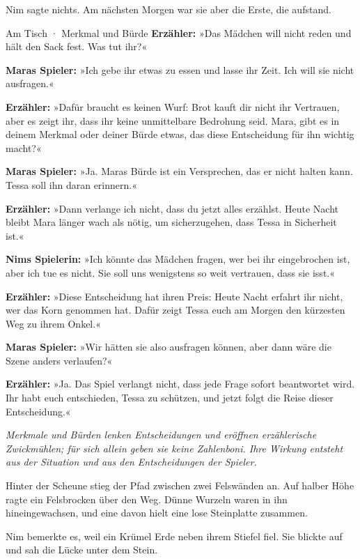\documentclass[10pt,a4paper]{article}
\begin{document}
Nim sagte nichts. Am nächsten Morgen war sie aber die Erste, die aufstand.
\begin{rpgexample}{Am Tisch · Merkmal und Bürde}
\textbf{Erzähler:} »Das Mädchen will nicht reden und hält den Sack fest. Was tut ihr?«

\textbf{Maras Spieler:} »Ich gebe ihr etwas zu essen und lasse ihr Zeit. Ich will sie nicht ausfragen.«

\textbf{Erzähler:} »Dafür braucht es keinen Wurf: Brot kauft dir nicht ihr Vertrauen, aber es zeigt ihr, dass ihr keine unmittelbare Bedrohung seid. Mara, gibt es in deinem Merkmal oder deiner Bürde etwas, das diese Entscheidung für ihn wichtig macht?«

\textbf{Maras Spieler:} »Ja. Maras Bürde ist ein Versprechen, das er nicht halten kann. Tessa soll ihn daran erinnern.«

\textbf{Erzähler:} »Dann verlange ich nicht, dass du jetzt alles erzählst. Heute Nacht bleibt Mara länger wach als nötig, um sicherzugehen, dass Tessa in Sicherheit ist.«

\textbf{Nims Spielerin:} »Ich könnte das Mädchen fragen, wer bei ihr eingebrochen ist, aber ich tue es nicht. Sie soll uns wenigstens so weit vertrauen, dass sie isst.«

\textbf{Erzähler:} »Diese Entscheidung hat ihren Preis: Heute Nacht erfahrt ihr nicht, wer das Korn genommen hat. Dafür zeigt Tessa euch am Morgen den kürzesten Weg zu ihrem Onkel.«

\textbf{Maras Spieler:} »Wir hätten sie also ausfragen können, aber dann wäre die Szene anders verlaufen?«

\textbf{Erzähler:} »Ja. Das Spiel verlangt nicht, dass jede Frage sofort beantwortet wird. Ihr habt euch entschieden, Tessa zu schützen, und jetzt folgt die Reise dieser Entscheidung.«

\emph{Merkmale und Bürden lenken Entscheidungen und eröffnen erzählerische Zwickmühlen; für sich allein geben sie keine Zahlenboni. Ihre Wirkung entsteht aus der Situation und aus den Entscheidungen der Spieler.}

\end{rpgexample}
Hinter der Scheune stieg der Pfad zwischen zwei Felswänden an. Auf halber Höhe ragte ein Felsbrocken über den Weg. Dünne Wurzeln waren in ihn hineingewachsen, und eine davon hielt eine lose Steinplatte zusammen.

Nim bemerkte es, weil ein Krümel Erde neben ihrem Stiefel fiel. Sie blickte auf und sah die Lücke unter dem Stein.
\end{document}
